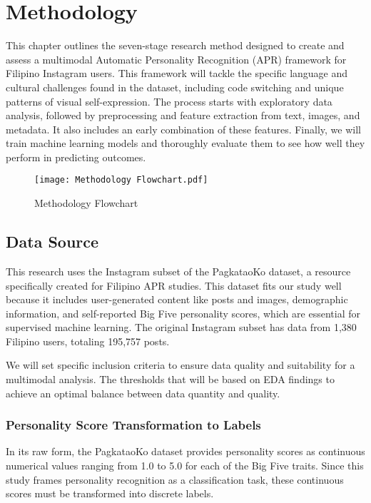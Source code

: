 \chapter{Methodology}
\label{sec:methodology}

This chapter outlines the seven-stage research method designed to create and assess a multimodal Automatic Personality Recognition (APR) framework for Filipino Instagram users. This framework will tackle the specific language and cultural challenges found in the dataset, including code switching and unique patterns of visual self-expression. The process starts with exploratory data analysis, followed by preprocessing and feature extraction from text, images, and metadata. It also includes an early combination of these features. Finally, we will train machine learning models and thoroughly evaluate them to see how well they perform in predicting outcomes.

\begin{figure}[H]
	\centering
	\texttt{[image: Methodology Flowchart.pdf]}
	\caption{Methodology Flowchart}
	\label{fig:methodology_pipeline}
\end{figure}

\section{Data Source}
\label{sec:data}
This research uses the Instagram subset of the PagkataoKo dataset, a resource specifically created for Filipino APR studies. This dataset fits our study well because it includes user-generated content like posts and images, demographic information, and self-reported Big Five personality scores, which are essential for supervised machine learning. The original Instagram subset has data from 1,380 Filipino users, totaling 195,757 posts. 

We will set specific inclusion criteria to ensure data quality and suitability for a multimodal analysis. The  thresholds that will be based on EDA findings to achieve an optimal balance between data quantity and quality. 

\subsection{Personality Score Transformation to Labels}
In its raw form, the PagkataoKo dataset provides personality scores as continuous numerical values ranging from 1.0 to 5.0 for each of the Big Five traits. Since this study frames personality recognition as a classification task, these continuous scores must be transformed into discrete labels.

